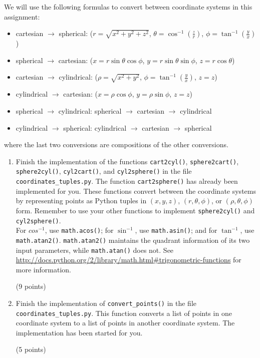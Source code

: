 \documentclass{article}
\newcounter{points}
\newcommand\setpoints[1]{\addtocounter{points}{#1}(#1 points)}
\begin{document}
\begin{enumerate}
\newpage
We will use the following formulas to convert between coordinate systems in this assignment:

\begin{itemize}
\item{cartesian $\rightarrow$ spherical: ($r = \sqrt{x^2 + y^2 + z^2}$, $\theta = \cos^{-1}\left(\frac{z}{r}\right)$, $\phi = \tan^{-1}\left(\frac{y}{x}\right)$)}
\item{spherical $\rightarrow$ cartesian: ($x = r\sin\theta\cos\phi$, $y = r\sin\theta\sin\phi$, $z = r\cos\theta$)}
\item{cartesian $\rightarrow$ cylindrical: ($\rho = \sqrt{x^2 + y^2}$, $\phi = \tan^{-1}\left(\frac{y}{x}\right)$, $z = z$)}
\item{cylindrical $\rightarrow$ cartesian: ($x = \rho\cos\phi$, $y = \rho\sin\phi$, $z = z$)}
\item{spherical $\rightarrow$ cylindrical: spherical $\rightarrow$ cartesian $\rightarrow$ cylindrical}
\item{cylindrical $\rightarrow$ spherical: cylindrical $\rightarrow$ cartesian $\rightarrow$ spherical}
\end{itemize}

where the last two conversions are compositions of the other conversions.

\begin{enumerate}
\item Finish the implementation of the functions \texttt{cart2cyl()}, \texttt{sphere2cart()}, \texttt{sphere2cyl()}, \texttt{cyl2cart()}, and \texttt{cyl2sphere()} in the file \texttt{coordinates\_tuples.py}.  The function \texttt{cart2sphere()} has already been implemented for you.  These functions convert between the coordinate systems by representing points as Python tuples in $(x, y, z)$, $(r, \theta, \phi)$, or $(\rho, \theta, \phi)$ form. Remember to use your other functions to implement \texttt{sphere2cyl()} and \texttt{cyl2sphere()}. \\

For $cos^{-1}$, use \texttt{math.acos()}; for $\sin^{-1}$, use \texttt{math.asin()}; and for $\tan^{-1}$, use \texttt{math.atan2()}.  \texttt{math.atan2()} maintains the quadrant information of its two input parameters, while \texttt{math.atan()} does not.  See \url{http://docs.python.org/2/library/math.html#trigonometric-functions} for more information.  \setpoints{9}
\end{enumerate}

\begin{enumerate}
\setcounter{enumii}{1}
\item Finish the implementation of \texttt{convert\_points()} in the file \texttt{coordinates\_tuples.py}.  This function converts a list of points in one coordinate system to a list of points in another coordinate system.  The implementation has been started for you.  \setpoints{5}
\end{enumerate}


\end{enumerate}
\end{document}
